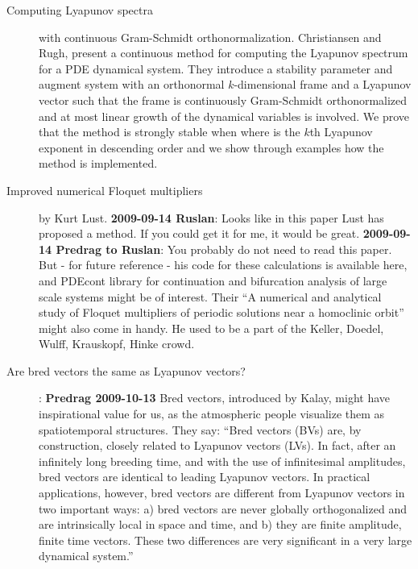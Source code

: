 \begin{description}
\item[Computing {L}yapunov spectra] with continuous
         {Gram-Schmidt} orthonormalization.
Christiansen and Rugh,
present a
  continuous method for computing the Lyapunov
  spectrum for a PDE dynamical system. They introduce a
  stability parameter and augment system with
  an orthonormal $k$-dimensional frame and a Lyapunov vector such
  that the frame is continuously Gram-Schmidt orthonormalized
  and at most linear growth of the dynamical variables is
  involved. We prove that the method is strongly stable when
  where is the $k$th Lyapunov exponent in descending order and we
  show through examples how the method is implemented.

\item[Improved numerical Floquet
multipliers] by
     {Kurt Lust}.  {\bf 2009-09-14 Ruslan}:
Looks like  in this paper {Lust} has proposed a method. If you
could get it for me, it would be great. {\bf 2009-09-14 Predrag
to Ruslan}: You probably do not need to read this paper.
But - for future reference - his
     code for these calculations is
     {available here}, and
     {PDEcont library}  for continuation and bifurcation analysis
      of large scale systems might be of interest.
Their ``A numerical and analytical study of Floquet
        multipliers of periodic solutions near
        a homoclinic orbit''
might also come in handy.
He used to be a part of the Keller, Doedel, Wulff, Krauskopf,
Hinke crowd.


\item[Are bred vectors the same as
    {L}yapunov vectors?]: {\bf Predrag
2009-10-13} Bred vectors, introduced by Kalay, might have
inspirational value for us, as the atmospheric people
visualize them as spatiotemporal structures. They say:
    ``Bred vectors (BVs) are, by construction, closely
related to Lyapunov vectors (LVs). In fact, after an
infinitely long breeding time, and with the use of
infinitesimal amplitudes, bred vectors are identical to
leading Lyapunov vectors. In practical applications,
however, bred vectors are different from Lyapunov
vectors in two important ways: a) bred vectors are
never globally orthogonalized and are intrinsically
local in space and time, and b) they are finite
amplitude, finite time vectors. These two differences
are very significant in a very large dynamical system.''



\end{description}
